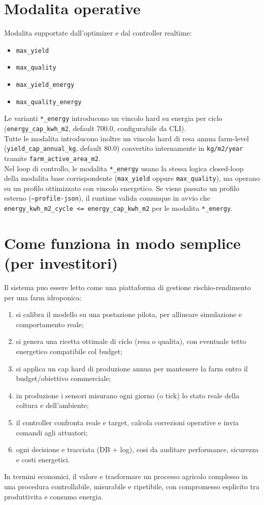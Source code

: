 ﻿\documentclass[11pt,a4paper]{report}
\begin{document}
\section{Modalita operative}
Modalita supportate dall'optimizer e dal controller realtime:
\begin{itemize}
  \item \texttt{max\_yield}
  \item \texttt{max\_quality}
  \item \texttt{max\_yield\_energy}
  \item \texttt{max\_quality\_energy}
\end{itemize}
Le varianti \texttt{*\_energy} introducono un vincolo hard su energia per ciclo
(\texttt{energy\_cap\_kwh\_m2}, default 700.0, configurabile da CLI).\\
Tutte le modalita introducono inoltre un vincolo hard di resa annua farm-level
(\texttt{yield\_cap\_annual\_kg}, default 80.0) convertito internamente in
\texttt{kg/m2/year} tramite \texttt{farm\_active\_area\_m2}.\\
Nel loop di controllo, le modalita \texttt{*\_energy} usano la stessa logica closed-loop della modalita base corrispondente
(\texttt{max\_yield} oppure \texttt{max\_quality}), ma operano su un profilo ottimizzato con vincolo energetico.
Se viene passato un profilo esterno (\texttt{--profile-json}), il runtime valida comunque in avvio che
\texttt{energy\_kwh\_m2\_cycle <= energy\_cap\_kwh\_m2} per le modalita \texttt{*\_energy}.

\section{Come funziona in modo semplice (per investitori)}
Il sistema puo essere letto come una piattaforma di gestione rischio-rendimento per una farm idroponica:
\begin{enumerate}
  \item si calibra il modello su una postazione pilota, per allineare simulazione e comportamento reale;
  \item si genera una ricetta ottimale di ciclo (resa o qualita), con eventuale tetto energetico compatibile col budget;
  \item si applica un cap hard di produzione annua per mantenere la farm entro il budget/obiettivo commerciale;
  \item in produzione i sensori misurano ogni giorno (o tick) lo stato reale della coltura e dell'ambiente;
  \item il controller confronta reale e target, calcola correzioni operative e invia comandi agli attuatori;
  \item ogni decisione e tracciata (DB + log), cosi da auditare performance, sicurezza e costi energetici.
\end{enumerate}
In termini economici, il valore e trasformare un processo agricolo complesso in una procedura controllabile,
misurabile e ripetibile, con compromesso esplicito tra produttivita e consumo energia.
\end{document}

